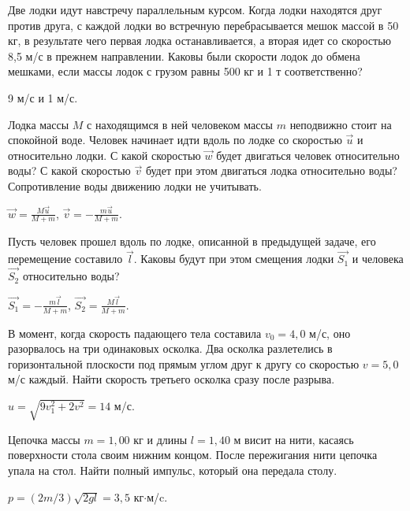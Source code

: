 \begin{ex} %
Две лодки идут навстречу параллельным курсом. Когда лодки находятся друг против друга, с каждой лодки во встречную перебрасывается мешок массой в 50 кг, в результате чего первая лодка останавливается, а вторая идет со скоростью 8,5 м/с в прежнем направлении. Каковы были скорости лодок до обмена мешками, если массы лодок с грузом равны 500 кг и 1 т соответственно?
\begin{ans}
9 м/с и 1 м/с.
\end{ans}
\end{ex}

\begin{ex} %
Лодка массы $M$ с находящимся в ней человеком массы $m$ неподвижно стоит на спокойной воде. Человек начинает идти вдоль по лодке со скоростью $\vec{u}$ и относительно лодки. С какой скоростью $\vec{w}$ будет двигаться человек относительно воды? С какой скоростью $\vec{v}$ будет при этом двигаться лодка относительно воды? Сопротивление воды движению лодки не учитывать.
\begin{ans}
$\vec{w} = \frac{M\vec{u}}{M+m}$, $\vec{v} = -\frac{m\vec{u}}{M+m}$.
\end{ans}
\end{ex}

\begin{ex} %
Пусть человек прошел вдоль по лодке, описанной в предыдущей задаче, его перемещение составило $\vec{l}$. Каковы будут при этом смещения лодки $\vec{S_1}$ и человека $\vec{S_2}$ относительно воды?
\begin{ans}
$\vec{S_1} = -\frac{m\vec{l}}{M+m}$, $\vec{S_2} = \frac{M\vec{l}}{M+m}$.
\end{ans}
\end{ex}

\complexProblems

\begin{ex} %
В момент, когда скорость падающего тела составила $v_0 = 4,0$ м/с, оно разорвалось на три одинаковых осколка. Два осколка разлетелись в горизонтальной плоскости под прямым углом друг к другу со скоростью $v = 5,0$ м/с каждый. Найти скорость третьего осколка сразу после разрыва.
\begin{ans}
$u = \sqrt{9v_{1}^2 + 2v^2} = 14$ м/с.
\end{ans}
\end{ex}

\begin{ex} %
Цепочка массы $m = 1,00$ кг и длины $l = 1,40$ м висит на нити, касаясь поверхности стола своим нижним концом. После пережигания нити цепочка упала на стол. Найти полный импульс, который она передала столу.
\begin{ans}
$p = (2m/3)\sqrt{2gl} = 3,5$ кг$\cdot$м/c.
\end{ans}
\end{ex}

